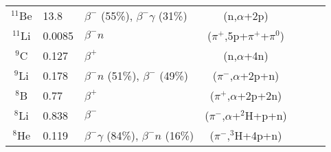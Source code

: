 \begin{table}[htbp]
\begin{tabular}{cllccll}
		$^{11}$Be        & 13.8                        & $\beta^{-}$ (55\%), $\beta^{-}\gamma$ (31\%)  & (n,$ \alpha $+2p)                          \\
		$^{11}$Li        & 0.0085                      & $\beta^{-}n$                                  & ($ \pi^{+} $,5p+$ \pi^{+} $+$ \pi^{0} $)   \\
		$^{9}$C          & 0.127                       & $\beta^{+}$                                   & (n,$ \alpha $+4n)                          \\
		$^{9}$Li         & 0.178                       & $\beta^{-}n$ (51\%), $\beta^{-}$ (49\%)       & ($ \pi^{-} $,$ \alpha $+2p+n)              \\
		$^{8}$B          & 0.77                        & $\beta^{+}$                                   & ($ \pi^{+} $,$ \alpha $+2p+2n)             \\
		$^{8}$Li         & 0.838                       & $\beta^{-}$                                   & ($ \pi^{-} $,$ \alpha $+$ ^{2} $H+p+n)     \\
		$^{8}$He         & 0.119                       & $\beta^{-}\gamma$ (84\%), $\beta^{-}n$ (16\%) & ($ \pi^{-} $,$ ^{3} $H+4p+n)               \\
		\bottomrule
	\end{tabular}
\end{table}



